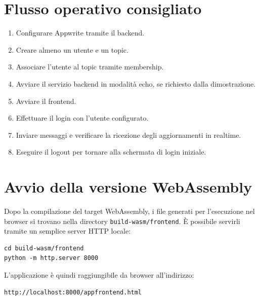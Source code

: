 \documentclass[a4paper, 11pt, twoside]{report}
\begin{document}
\section{Flusso operativo consigliato}

\begin{enumerate}
    \item Configurare Appwrite tramite il backend.
    \item Creare almeno un utente e un topic.
    \item Associare l'utente al topic tramite membership.
    \item Avviare il servizio backend in modalità echo, se richiesto dalla dimostrazione.
    \item Avviare il frontend.
    \item Effettuare il login con l'utente configurato.
    \item Inviare messaggi e verificare la ricezione degli aggiornamenti in realtime.
    \item Eseguire il logout per tornare alla schermata di login iniziale.
\end{enumerate}

\newpage

\section{Avvio della versione WebAssembly}

Dopo la compilazione del target WebAssembly, i file generati per l'esecuzione nel browser si trovano nella directory
\texttt{build-wasm/frontend}. È possibile servirli tramite un semplice server HTTP locale:

\begin{verbatim}
cd build-wasm/frontend
python -m http.server 8000
\end{verbatim}

\noindent L'applicazione è quindi raggiungibile da browser all'indirizzo:

\begin{verbatim}
http://localhost:8000/appfrontend.html
\end{verbatim}
\end{document}
